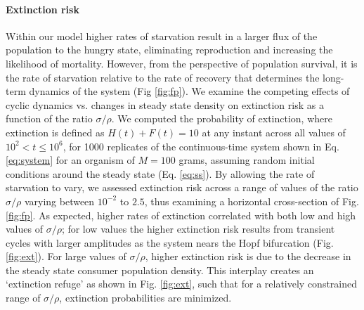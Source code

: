 \documentclass{pnastwo}
\begin{document}
\begin{article}
\paragraph{Extinction risk}
Within our model higher rates of starvation result in a larger flux of the population to the hungry state, eliminating reproduction and increasing the likelihood of mortality. However, from the perspective of population survival, it is the rate of starvation relative to the rate of recovery that determines the long-term dynamics of the system (Fig \ref{fig:fp}). We examine the competing effects of cyclic dynamics vs. changes in steady state density on extinction risk as a function of the ratio $\sigma/\rho$.
We computed the probability of extinction, where extinction is defined as $H(t)+F(t)=10$ at any instant across all values of $10^2<t\leq 10^6$, for 1000 replicates of the continuous-time system shown in Eq. \ref{eq:system} for an organism of $M=100$ grams, assuming random initial conditions around the steady state (Eq. \ref{eq:ss}). %
By allowing the rate of starvation to vary, we assessed extinction risk across a range of values of the ratio $\sigma/\rho$ varying between $10^{-2}$ to $2.5$, thus examining a horizontal cross-section of Fig. \ref{fig:fp}.
As expected, higher rates of extinction correlated with both low and high values of $\sigma/\rho$; for low values the higher extinction risk results from transient cycles with larger amplitudes as the system nears the Hopf bifurcation (Fig. \ref{fig:ext}).
For large values of $\sigma/\rho$, higher extinction risk is due to the decrease in the steady state consumer population density.
This interplay creates an `extinction refuge' as shown in Fig. \ref{fig:ext}, such that for a relatively constrained range of $\sigma/\rho$, extinction probabilities are minimized.


\end{article}
\end{document}
